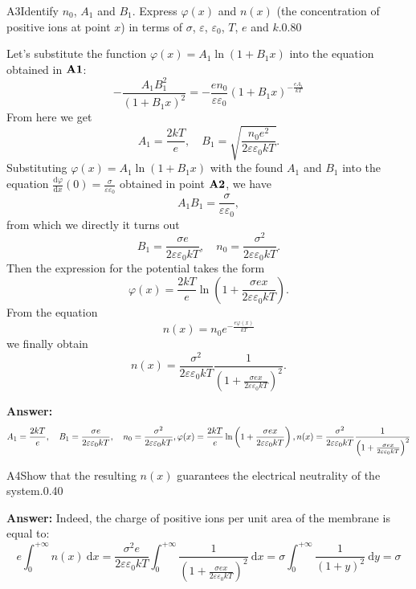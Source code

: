 \documentclass[11pt,a4paper]{article}
\begin{document}
\begin{solcard}{A3}{Identify $n_0$, $A_1$ and $B_1$. Express $\varphi(x)$ and $n(x)$ (the concentration of positive ions at point $x$) in terms of $\sigma$, $\varepsilon$, $\varepsilon_0$, $T$, $e$ and $k$.}{0.80}

Let's substitute the function $\varphi(x)=A_1\ln(1+B_1x)$ into the equation obtained in $\bf A1$: \[-\frac{A_1B_1^2}{(1+B_1x)^2}=-\frac{en_0}{\varepsilon\varepsilon_0}(1+B_1x)^{-\frac{eA_1}{kT}}\]From here we get\[A_1=\frac{2kT}e,\quad B_1=\sqrt{\frac{n_0e^2}{2\varepsilon\varepsilon_0kT}}.\]Substituting $\varphi(x)=A_1\ln(1+B_1x)$ with the found $A_1$ and $B_1$ into the equation $\frac{\mathrm d\varphi}{\mathrm dx}(0)=\frac\sigma{\varepsilon\varepsilon_0}$ obtained in point $\bf A2$, we have\[A_1B_1=\frac{\sigma}{\varepsilon\varepsilon_0},\]from which we directly it turns out\[B_1=\frac{\sigma e}{2\varepsilon\varepsilon_0kT},\quad n_0=\frac{\sigma^2}{2\varepsilon\varepsilon_0kT}.\]Then the expression for the potential takes the form\[\varphi(x)=\frac{2kT}e\ln\left(1+\frac{\sigma ex}{2\varepsilon\varepsilon_0kT}\right).\]From the equation\[n(x)=n_0e^{-\frac{e\varphi(x)}{kT}}\]we finally obtain\[n(x)=\frac{\sigma^2}{2\varepsilon\varepsilon_0kT}\frac1{\left(1+\frac{\sigma ex}{2\varepsilon\varepsilon_0kT}\right)^2}.\]

\par\smallskip\noindent\textbf{Answer:} \[A_1=\frac{2kT}e,\quad B_1=\frac{\sigma e}{2\varepsilon\varepsilon_0kT},\quad n_0=\frac{\sigma^2}{2\varepsilon\varepsilon_0kT},\\\varphi(x)=\frac{2kT}e\ln\left(1+\frac{\sigma ex}{2\varepsilon\varepsilon_0kT}\right),\\n(x)=\frac{\sigma^2}{2\varepsilon\varepsilon_0kT}\frac1{\left(1+\frac{\sigma ex}{2\varepsilon\varepsilon_0kT}\right)^2}\]
\end{solcard}

\begin{solcard}{A4}{Show that the resulting $n(x)$ guarantees the electrical neutrality of the system.}{0.40}
\par\smallskip\noindent\textbf{Answer:} Indeed, the charge of positive ions per unit area of the membrane is equal to: \[e\int_0^{+\infty}n(x)\mathrm{~d}x=\frac{\sigma^2e}{2\varepsilon\varepsilon_0kT}\int_0^{+\infty}\frac1{\left(1+\frac{\sigma ex}{2\varepsilon\varepsilon_0kT}\right)^2}\mathrm{~d}x=\sigma\int_0^{+\infty}\frac1{(1+y)^2}\mathrm{~d}y=\sigma\]
\end{solcard}
\end{document}

